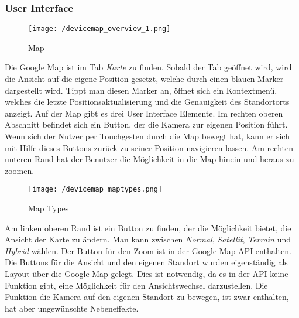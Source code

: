 \subsubsection{User Interface}

\begin{wrapfigure}{r}{40mm}
\vspace{-5mm}
\texttt{[image: /devicemap\_overview\_1.png]}
\vspace{-10mm}
\caption[User Interface: Device Map]{Map}
\vspace{-10mm}
\end{wrapfigure}

Die Google Map ist im Tab \textit{Karte} zu finden. Sobald der Tab geöffnet wird, wird die Ansicht auf die eigene Position gesetzt, welche durch einen blauen Marker dargestellt wird. Tippt man diesen Marker an, öffnet sich ein Kontextmenü, welches die letzte Positionsaktualisierung und die Genauigkeit des Standortorts anzeigt.
Auf der Map gibt es drei User Interface Elemente. Im rechten oberen Abschnitt befindet sich ein Button, der die Kamera zur eigenen Position führt. Wenn sich der Nutzer per Touchgesten durch die Map bewegt hat, kann er sich mit Hilfe dieses Buttons zurück zu seiner Position navigieren lassen. Am rechten unteren Rand hat der Benutzer die Möglichkeit in die Map hinein und heraus zu zoomen. 
\par\bigskip\bigskip
\begin{wrapfigure}{l}{40mm}
\centering
\vspace{-10mm}
   \texttt{[image: /devicemap\_maptypes.png]} 
\vspace{-10mm}
\caption[User Interface: Map Types]{Map Types}
\vspace{-20mm}
\end{wrapfigure}

Am linken oberen Rand ist ein Button zu finden, der die Möglichkeit bietet, die Ansicht der Karte zu ändern. Man kann zwischen \textit{Normal}, \textit{Satellit}, \textit{Terrain} und \textit{Hybrid} wählen. 
Der Button für den Zoom ist in der Google Map API enthalten. Die Buttons für die Ansicht und den eigenen Standort wurden eigenständig als Layout über die Google Map gelegt. Dies ist notwendig, da es in der API keine Funktion gibt, eine Möglichkeit für den Ansichtswechsel darzustellen. Die Funktion die Kamera auf den eigenen Standort zu bewegen, ist zwar enthalten, hat aber ungewünschte Nebeneffekte. 
\par\bigskip\bigskip\bigskip\bigskip

